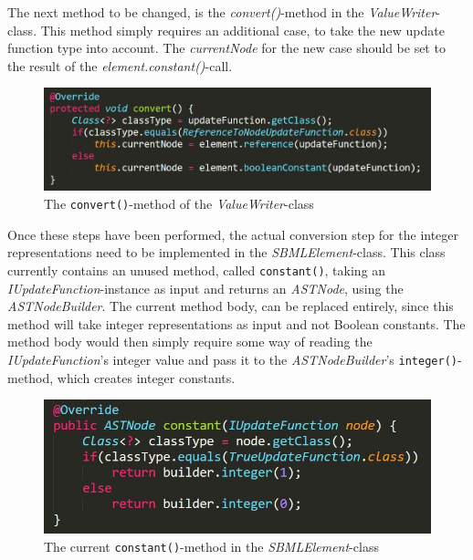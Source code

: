 The next method to be changed, is the \emph{convert()}-method in the \emph{ValueWriter}-class. This method simply requires an additional case, to take the new update function type into account. The \emph{currentNode} for the new case should be set to the result of the \emph{element.constant()}-call.

\begin{figure}[H]
    \centering
    \includegraphics[scale=0.5]{Sections/Images/ValueWriterConvert.JPG}
    \caption{The \texttt{convert()}-method of the \emph{ValueWriter}-class}
    \label{fig:WriterConvert}
\end{figure}

Once these steps have been performed, the actual conversion step for the integer representations need to be implemented in the \emph{SBMLElement}-class. This class currently contains an unused method, called \texttt{constant()}, taking an \emph{IUpdateFunction}-instance as input and returns an \emph{ASTNode}, using the \emph{ASTNodeBuilder}.
The current method body, can be replaced entirely, since this method will take integer representations as input and not Boolean constants. The method body would then simply require some way of reading the \emph{IUpdateFunction}'s integer value and pass it to the \emph{ASTNodeBuilder}'s \texttt{integer()}-method, which creates integer constants.

\begin{figure}[H]
    \centering
    \includegraphics[scale=0.5]{Sections/Images/ConstantMethod.JPG}
    \caption{The current \texttt{constant()}-method in the \emph{SBMLElement}-class}
    \label{fig:SBMLconstant}
\end{figure}

